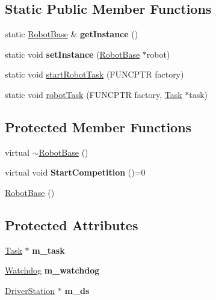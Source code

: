 \subsection*{Static Public Member Functions}
\begin{DoxyCompactItemize}
\item 
\hypertarget{classRobotBase_a033b604c5513471b426655c125ec9c17}{
static \hyperlink{classRobotBase}{RobotBase} \& {\bfseries getInstance} ()}
\label{classRobotBase_a033b604c5513471b426655c125ec9c17}

\item 
\hypertarget{classRobotBase_a2bc3fec3a452f5aaaa3d13b06dfc4798}{
static void {\bfseries setInstance} (\hyperlink{classRobotBase}{RobotBase} $\ast$robot)}
\label{classRobotBase_a2bc3fec3a452f5aaaa3d13b06dfc4798}

\item 
static void \hyperlink{classRobotBase_a17eddc47e75e82e61b89afc9f6ce3fcb}{startRobotTask} (FUNCPTR factory)
\item 
static void \hyperlink{classRobotBase_a005838dfd01d67d0b5947d3f5bbac0fe}{robotTask} (FUNCPTR factory, \hyperlink{classTask}{Task} $\ast$task)
\end{DoxyCompactItemize}
\subsection*{Protected Member Functions}
\begin{DoxyCompactItemize}
\item 
virtual \hyperlink{classRobotBase_a2229cb79a79e0f4fc9fd600e33740a04}{$\sim$RobotBase} ()
\item 
\hypertarget{classRobotBase_a4eadc124fd0004a681055a51223a4c7a}{
virtual void {\bfseries StartCompetition} ()=0}
\label{classRobotBase_a4eadc124fd0004a681055a51223a4c7a}

\item 
\hyperlink{classRobotBase_a3043a0a78f4ec0e1e449eeed0a5db6e5}{RobotBase} ()
\end{DoxyCompactItemize}
\subsection*{Protected Attributes}
\begin{DoxyCompactItemize}
\item 
\hypertarget{classRobotBase_a213426ebf60e0d6987c801f44323e179}{
\hyperlink{classTask}{Task} $\ast$ {\bfseries m\_\-task}}
\label{classRobotBase_a213426ebf60e0d6987c801f44323e179}

\item 
\hypertarget{classRobotBase_aaec2f8b8d1f42b6ab500ae2ea6dd6dbe}{
\hyperlink{classWatchdog}{Watchdog} {\bfseries m\_\-watchdog}}
\label{classRobotBase_aaec2f8b8d1f42b6ab500ae2ea6dd6dbe}

\item 
\hypertarget{classRobotBase_ae9b4f4ce5604f2ca54e549ae1bf8f3ff}{
\hyperlink{classDriverStation}{DriverStation} $\ast$ {\bfseries m\_\-ds}}
\label{classRobotBase_ae9b4f4ce5604f2ca54e549ae1bf8f3ff}

\end{DoxyCompactItemize}
